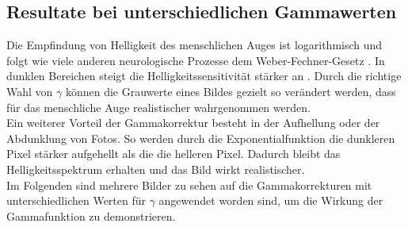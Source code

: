 \documentclass[course=erap]{aspdoc}
\begin{document}
\subsection{Resultate bei unterschiedlichen Gammawerten}
Die Empfindung von Helligkeit des menschlichen Auges ist logarithmisch und folgt wie viele anderen neurologische Prozesse dem Weber-Fechner-Gesetz \cite{weberFechnerGesetz}. In dunklen Bereichen steigt die Helligkeitssensitivität stärker an \cite{Logarithmische_Helligkeitswahrnehmung}. Durch die richtige Wahl von $\gamma$ können die Grauwerte eines Bildes gezielt so verändert werden, dass für das menschliche Auge realistischer wahrgenommen werden. 
\\
\newline
Ein weiterer Vorteil der Gammakorrektur besteht in der Aufhellung oder der Abdunklung von Fotos. So werden durch die Exponentialfunktion die dunkleren Pixel stärker aufgehellt als die die helleren Pixel. \cite{gammKorrekturWikipedia}
Dadurch bleibt das Helligkeitsspektrum erhalten und das Bild wirkt realistischer. 
\\
\newline
Im Folgenden sind mehrere Bilder zu sehen auf die Gammakorrekturen mit unterschiedlichen Werten für $\gamma$ angewendet worden sind, um die Wirkung der Gammafunktion zu demonstrieren.    
\end{document}

